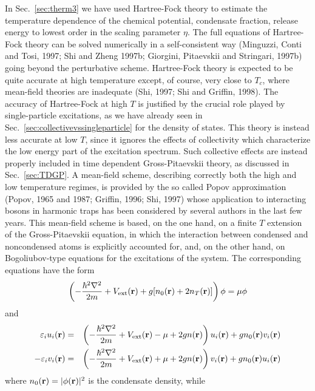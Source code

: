 In Sec.~\ref{sec:therm3} we have used Hartree-Fock theory to  estimate the
temperature dependence of the chemical potential, condensate fraction,
release energy to lowest order in the scaling parameter $\eta$. The full
equations of  Hartree-Fock theory can be  solved numerically in a
self-consistent way (Minguzzi, Conti and Tosi, 1997; Shi and Zheng  1997b;
Giorgini, Pitaevskii and Stringari, 1997b) going beyond the perturbative 
scheme. Hartree-Fock theory is expected to be quite accurate at high 
temperature except, of course,  very close to $T_c$, where mean-field 
theories are inadequate (Shi, 1997; Shi and Griffin, 1998). The accuracy 
of  Hartree-Fock at high $T$ is justified by the
crucial role played by single-particle excitations, as we have already
seen in Sec.~\ref{sec:collectivevssingleparticle} for the density
of states.  This theory is instead less accurate at low $T$, since it 
ignores the effects of collectivity which characterize the low energy
part of the excitation spectrum. Such collective effects are instead
properly included in time dependent Gross-Pitaevskii theory, as
discussed in Sec.~\ref{sec:TDGP}.  A mean-field scheme, describing
correctly  both the high and low temperature regimes, is provided by the
so called Popov approximation (Popov, 1965 and 1987; Griffin, 1996; Shi, 
1997) whose  application to interacting
bosons in harmonic traps  has been considered by several authors in the
last few years.  This mean-field scheme is based,  on the one hand, on a
finite $T$ extension of the Gross-Pitaevskii equation, in which the
interaction between condensed and noncondensed atoms is explicitly
accounted for, and, on the other hand, on Bogoliubov-type equations
for the excitations of the system. The corresponding
equations have the form
\begin{equation}
\left(-{\hbar^2\nabla^2 \over 2m} + V_{\rm ext}({\bf r}) +
g[n_0({\bf r})+2n_T({\bf r})]\right)\phi=\mu\phi
\label{eq:popov}
\end{equation}
and
\begin{eqnarray}
\varepsilon_i u_i({\bf r}) &=& \left( -\frac{\hbar^2\nabla^2}{2m}
+V_{\rm ext}({\bf r})
-\mu+2gn({\bf r})\right) u_i({\bf r}) + gn_0({\bf r})v_i({\bf r})
\label{eq:popov1}
 \\
- \varepsilon_i v_i({\bf r}) &=& \left( -\frac{\hbar^2\nabla^2}{2m}
+V_{\rm ext}({\bf r})
+\mu+2gn({\bf r})\right) v_i({\bf r}) + gn_0({\bf r})u_i({\bf r})
\label{eq:popov2}
\end{eqnarray}
where $n_0({\bf r})=|\phi({\bf r})|^2$ is the condensate density, while
